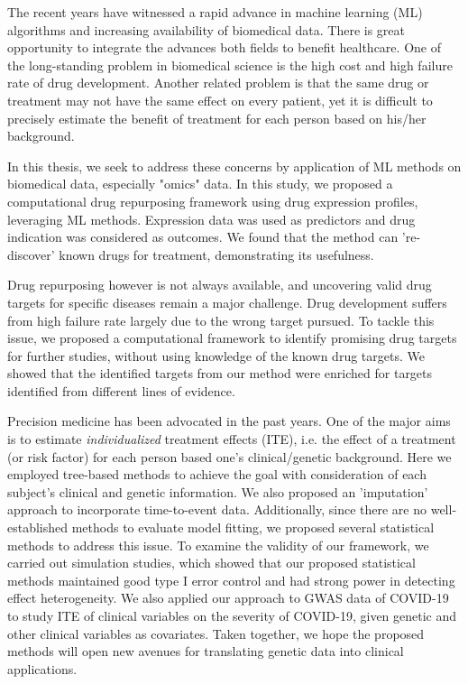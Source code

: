The recent years have witnessed a rapid advance in machine learning (ML) algorithms and increasing availability of biomedical data. There is great opportunity to integrate the advances both fields to benefit healthcare. One of the long-standing problem in biomedical science is the high cost and high failure rate of drug development. Another related problem is that the same drug or treatment may not have the same effect on every patient, yet it is difficult to precisely estimate the benefit of treatment for each person based on his/her background. 

In this thesis, we seek to address these concerns by application of ML methods on biomedical data, especially "omics" data. In this study, we proposed a computational drug repurposing framework using drug expression profiles, leveraging ML methods.  Expression data was used as predictors and drug indication was considered as outcomes. We found that the method can 're-discover' known drugs for treatment, demonstrating its usefulness. 

Drug repurposing however is not always available, and uncovering valid drug targets for specific diseases remain a major challenge. Drug development suffers from high failure rate largely due to the wrong target pursued. To tackle this issue, we proposed a computational framework to identify promising drug targets for further studies, without using knowledge of the known drug targets. We showed that the identified targets from our method were enriched for targets identified from different lines of evidence. 

Precision medicine has been advocated in the past years. One of the major aims is to estimate\textit{ individualized} treatment effects (ITE), i.e. the effect of a treatment (or risk factor) for each person based one's clinical/genetic background. Here we employed tree-based methods to achieve the goal with consideration of each subject's clinical and genetic information. We also proposed an 'imputation' approach to incorporate time-to-event data. Additionally, since there are no well-established methods to evaluate model fitting, we proposed several statistical methods to address this issue. To examine the validity of our framework, we carried out simulation studies, which showed that our proposed statistical methods maintained good type I error control and had strong power in detecting effect heterogeneity. We also applied our approach to GWAS data of COVID-19 to study ITE of clinical variables on the severity of COVID-19, given genetic and other clinical variables as covariates. Taken together, we hope the proposed methods will open new avenues for translating genetic data into clinical applications. 